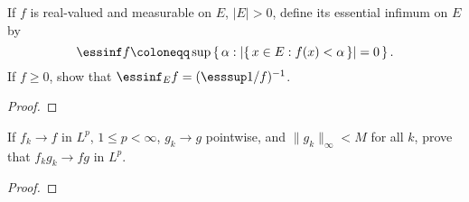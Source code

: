 \begin{problem}
If $f$ is real-valued and measurable on $E$, $|E|>0$, define its essential
infimum on $E$ by
\[
\essinf f\coloneqq\sup\left\{\,\alpha:\left|\{\,x\in
    E:f(x)<\alpha\,\}\right|=0\,\right\}.
\]
If $f\geq 0$, show that $\essinf_E f=(\esssup 1/f)^{-1}$.
\end{problem}
\begin{proof}
\end{proof}
\newpage

\begin{problem}
If $f_k\to f$ in $L^p$, $1\leq p<\infty$, $g_k\to g$ pointwise, and
$\|g_k\|_\infty<M$ for all $k$, prove that $f_kg_k\to fg$ in $L^p$.
\end{problem}
\begin{proof}
\end{proof}

